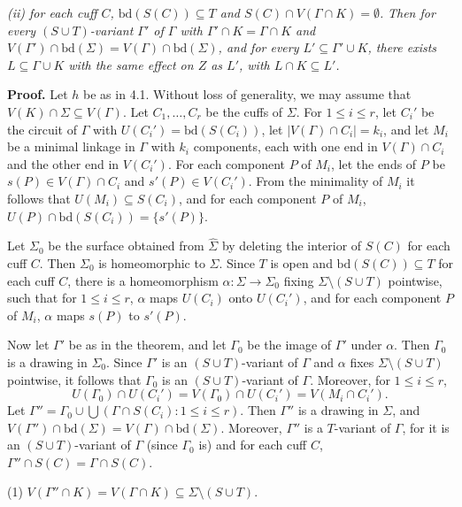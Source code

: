 \textit{(ii) for each cuff $C$, $\text{bd}(S(C)) \subseteq T$ and $S(C) \cap V(\Gamma \cap K) = \emptyset$.} \textit{Then for every $(S \cup T)$-variant $\Gamma'$ of $\Gamma$ with $\Gamma' \cap K = \Gamma \cap K$ and $V(\Gamma') \cap \text{bd}(\Sigma) = V(\Gamma) \cap \text{bd}(\Sigma)$, and for every $L' \subseteq \Gamma' \cup K$, there exists $L \subseteq \Gamma \cup K$ with the same effect on $Z$ as $L'$, with $L \cap K \subseteq L'$.}

\textbf{Proof.} Let $h$ be as in 4.1. Without loss of generality, we may assume that $V(K) \cap \Sigma \subseteq V(\Gamma)$. Let $C_1, \ldots, C_r$ be the cuffs of $\Sigma$. For $1 \le i \le r$, let $C_i'$ be the circuit of $\Gamma$ with $U(C_i') = \text{bd}(S(C_i))$, let $|V(\Gamma) \cap C_i| = k_i$, and let $M_i$ be a minimal linkage in $\Gamma$ with $k_i$ components, each with one end in $V(\Gamma) \cap C_i$ and the other end in $V(C_i')$. For each component $P$ of $M_i$, let the ends of $P$ be $s(P) \in V(\Gamma) \cap C_i$ and $s'(P) \in V(C_i')$. From the minimality of $M_i$ it follows that $U(M_i) \subseteq S(C_i)$, and for each component $P$ of $M_i$, $U(P) \cap \text{bd}(S(C_i)) = \{s'(P)\}$.

Let $\Sigma_0$ be the surface obtained from $\hat{\Sigma}$ by deleting the interior of $S(C)$ for each cuff $C$. Then $\Sigma_0$ is homeomorphic to $\Sigma$. Since $T$ is open and $\text{bd}(S(C)) \subseteq T$ for each cuff $C$, there is a homeomorphism $\alpha \colon \Sigma \to \Sigma_0$ fixing $\Sigma \setminus (S \cup T)$ pointwise, such that for $1 \le i \le r$, $\alpha$ maps $U(C_i)$ onto $U(C_i')$, and for each component $P$ of $M_i$, $\alpha$ maps $s(P)$ to $s'(P)$.

Now let $\Gamma'$ be as in the theorem, and let $\Gamma_0$ be the image of $\Gamma'$ under $\alpha$. Then $\Gamma_0$ is a drawing in $\Sigma_0$. Since $\Gamma'$ is an $(S \cup T)$-variant of $\Gamma$ and $\alpha$ fixes $\Sigma \setminus (S \cup T)$ pointwise, it follows that $\Gamma_0$ is an $(S \cup T)$-variant of $\Gamma$. Moreover, for $1 \le i \le r$,
\begin{equation*}
U(\Gamma_0) \cap U(C_i') = V(\Gamma_0) \cap U(C_i') = V(M_i \cap C_i').
\end{equation*}
Let $\Gamma'' = \Gamma_0 \cup \bigcup ( \Gamma \cap S(C_i) : 1 \le i \le r )$. Then $\Gamma''$ is a drawing in $\Sigma$, and $V(\Gamma'') \cap \text{bd}(\Sigma) = V(\Gamma) \cap \text{bd}(\Sigma)$. Moreover, $\Gamma''$ is a $T$-variant of $\Gamma$, for it is an $(S \cup T)$-variant of $\Gamma$ (since $\Gamma_0$ is) and for each cuff $C$, $\Gamma'' \cap S(C) = \Gamma \cap S(C)$.

\hspace*{12pt}(1) $V(\Gamma'' \cap K) = V(\Gamma \cap K) \subseteq \Sigma \setminus (S \cup T)$.
